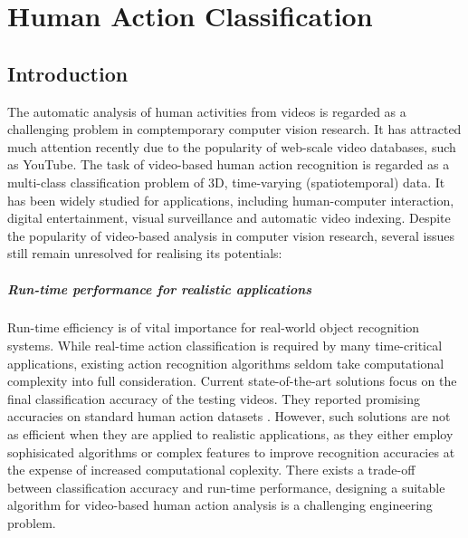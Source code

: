 \chapter{Human Action Classification}
\label{chap/act}

\section{Introduction}
\label{sec/act/intro}

The automatic analysis of human activities from videos is regarded as a challenging problem in comptemporary computer vision research. 
It has attracted much attention recently due to the popularity of web-scale video databases, such as YouTube. 
The task of video-based human action recognition is regarded as a multi-class classification problem of 3D, time-varying (spatiotemporal) data. 
It has been widely studied for applications, including human-computer interaction, digital entertainment, visual surveillance and automatic video indexing.  
Despite the popularity of video-based analysis in computer vision research, several issues still remain unresolved for realising its potentials: 

\paragraph{Run-time performance for realistic applications} Run-time efficiency is of vital importance for real-world object recognition systems. 
While real-time action classification is required by many time-critical applications, existing action recognition algorithms seldom take computational complexity into full consideration. Current state-of-the-art solutions focus on the final classification accuracy of the testing videos. They reported promising accuracies on standard human action datasets \cite{Kim2007, Lin2009, Liu2008, Willems2009}. However, such solutions are not as efficient when they are applied to realistic applications, as they either employ sophisicated algorithms or complex features to improve recognition accuracies at the expense of increased computational coplexity. There exists a trade-off between classification accuracy and run-time performance, designing a suitable algorithm for video-based human action analysis is a challenging engineering problem.  

